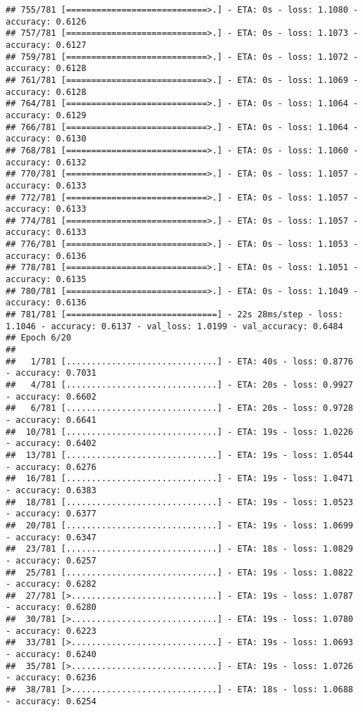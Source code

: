 \documentclass[
]{article}
\begin{document}
\begin{verbatim}
## 755/781 [============================>.] - ETA: 0s - loss: 1.1080 - accuracy: 0.6126
## 757/781 [============================>.] - ETA: 0s - loss: 1.1073 - accuracy: 0.6127
## 759/781 [============================>.] - ETA: 0s - loss: 1.1072 - accuracy: 0.6128
## 761/781 [============================>.] - ETA: 0s - loss: 1.1069 - accuracy: 0.6128
## 764/781 [============================>.] - ETA: 0s - loss: 1.1064 - accuracy: 0.6129
## 766/781 [============================>.] - ETA: 0s - loss: 1.1064 - accuracy: 0.6130
## 768/781 [============================>.] - ETA: 0s - loss: 1.1060 - accuracy: 0.6132
## 770/781 [============================>.] - ETA: 0s - loss: 1.1057 - accuracy: 0.6133
## 772/781 [============================>.] - ETA: 0s - loss: 1.1057 - accuracy: 0.6133
## 774/781 [============================>.] - ETA: 0s - loss: 1.1057 - accuracy: 0.6133
## 776/781 [============================>.] - ETA: 0s - loss: 1.1053 - accuracy: 0.6136
## 778/781 [============================>.] - ETA: 0s - loss: 1.1051 - accuracy: 0.6135
## 780/781 [============================>.] - ETA: 0s - loss: 1.1049 - accuracy: 0.6136
## 781/781 [==============================] - 22s 28ms/step - loss: 1.1046 - accuracy: 0.6137 - val_loss: 1.0199 - val_accuracy: 0.6484
## Epoch 6/20
## 
##   1/781 [..............................] - ETA: 40s - loss: 0.8776 - accuracy: 0.7031
##   4/781 [..............................] - ETA: 20s - loss: 0.9927 - accuracy: 0.6602
##   6/781 [..............................] - ETA: 20s - loss: 0.9728 - accuracy: 0.6641
##  10/781 [..............................] - ETA: 19s - loss: 1.0226 - accuracy: 0.6402
##  13/781 [..............................] - ETA: 19s - loss: 1.0544 - accuracy: 0.6276
##  16/781 [..............................] - ETA: 19s - loss: 1.0471 - accuracy: 0.6383
##  18/781 [..............................] - ETA: 19s - loss: 1.0523 - accuracy: 0.6377
##  20/781 [..............................] - ETA: 19s - loss: 1.0699 - accuracy: 0.6347
##  23/781 [..............................] - ETA: 18s - loss: 1.0829 - accuracy: 0.6257
##  25/781 [..............................] - ETA: 19s - loss: 1.0822 - accuracy: 0.6282
##  27/781 [>.............................] - ETA: 19s - loss: 1.0787 - accuracy: 0.6280
##  30/781 [>.............................] - ETA: 19s - loss: 1.0780 - accuracy: 0.6223
##  33/781 [>.............................] - ETA: 19s - loss: 1.0693 - accuracy: 0.6240
##  35/781 [>.............................] - ETA: 19s - loss: 1.0726 - accuracy: 0.6236
##  38/781 [>.............................] - ETA: 18s - loss: 1.0688 - accuracy: 0.6254

\end{verbatim}
\end{document}
